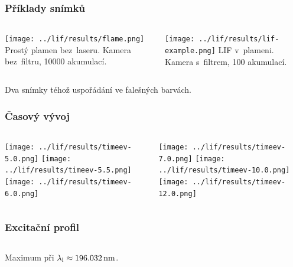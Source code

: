 \documentclass{beamer}
\newcommand\wavelenlaser{\wavelen_\text{l}}
\begin{document}
\begin{frame}
	\frametitle{Příklady snímků}
	\begin{columns}[t]
		\begin{column}{0.48\textwidth}
			\texttt{[image: ../lif/results/flame.png]}
			Prostý plamen bez~laseru. Kamera bez~filtru, 10000 akumulací.
		\end{column}
		\begin{column}{0.48\textwidth}
			\texttt{[image: ../lif/results/lif-example.png]}
			LIF v~plameni. Kamera s~filtrem, 100 akumulací.
		\end{column}
	\end{columns}
	\bigskip
	Dva snímky téhož uspořádání ve falešných barvách.
\end{frame}

\begin{frame}
	\frametitle{Časový vývoj}
	\begin{columns}[c]
		\begin{column}{0.48\textwidth}
			\centering
			\texttt{[image: ../lif/results/timeev-5.0.png]}
			\texttt{[image: ../lif/results/timeev-5.5.png]}
			\texttt{[image: ../lif/results/timeev-6.0.png]}
		\end{column}
		\begin{column}{0.48\textwidth}
			\centering
			\texttt{[image: ../lif/results/timeev-7.0.png]}
			\texttt{[image: ../lif/results/timeev-10.0.png]}
			\texttt{[image: ../lif/results/timeev-12.0.png]}
		\end{column}
	\end{columns}
\end{frame}

\begin{frame}
	\frametitle{Excitační profil}
	\begin{columns}[c]
		\begin{column}{0.48\textwidth}
		\end{column}
		\begin{column}{0.48\textwidth}
		\end{column}
	\end{columns}
	\bigskip
	Maximum při $\wavelenlaser \approx \SI{196.032}{\nano\metre}$.
\end{frame}
\end{document}

